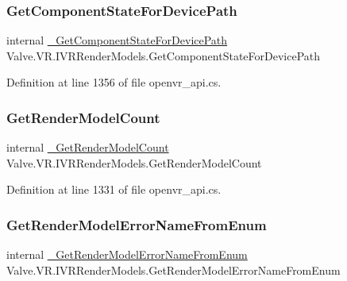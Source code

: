 \subsubsection{\texorpdfstring{GetComponentStateForDevicePath}{GetComponentStateForDevicePath}}
{\footnotesize\ttfamily internal \mbox{\hyperlink{struct_valve_1_1_v_r_1_1_i_v_r_render_models_a3ad1b8d8db45befef29127e2c1072741}{\+\_\+\+Get\+Component\+State\+For\+Device\+Path}} Valve.\+V\+R.\+I\+V\+R\+Render\+Models.\+Get\+Component\+State\+For\+Device\+Path}



Definition at line 1356 of file openvr\+\_\+api.\+cs.

\mbox{\label{struct_valve_1_1_v_r_1_1_i_v_r_render_models_aba17e8a856f5a780979f2c6d9227025d}} 
\subsubsection{\texorpdfstring{GetRenderModelCount}{GetRenderModelCount}}
{\footnotesize\ttfamily internal \mbox{\hyperlink{struct_valve_1_1_v_r_1_1_i_v_r_render_models_a4957e84d66519ffebc626ccf121a607c}{\+\_\+\+Get\+Render\+Model\+Count}} Valve.\+V\+R.\+I\+V\+R\+Render\+Models.\+Get\+Render\+Model\+Count}



Definition at line 1331 of file openvr\+\_\+api.\+cs.

\mbox{\label{struct_valve_1_1_v_r_1_1_i_v_r_render_models_aa01437af440f55c1e94754fd35c78cf5}} 
\subsubsection{\texorpdfstring{GetRenderModelErrorNameFromEnum}{GetRenderModelErrorNameFromEnum}}
{\footnotesize\ttfamily internal \mbox{\hyperlink{struct_valve_1_1_v_r_1_1_i_v_r_render_models_afbb07d42a16772bf58407406e41e9aac}{\+\_\+\+Get\+Render\+Model\+Error\+Name\+From\+Enum}} Valve.\+V\+R.\+I\+V\+R\+Render\+Models.\+Get\+Render\+Model\+Error\+Name\+From\+Enum}




